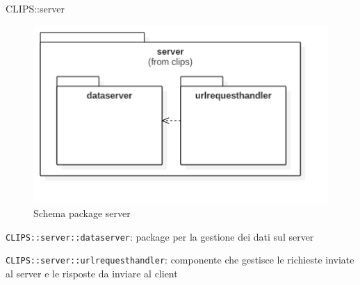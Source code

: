 \begin{componente}{CLIPS::server}
\begin{figure}[h!]
\centering
\includegraphics[scale=0.4]{img/package/png/server.png}
\caption{Schema package server}
 \end{figure}
\begin{compPackageContenuti}
\item \texttt{CLIPS::server::dataserver}: package per la gestione dei dati sul server
\item \texttt{CLIPS::server::urlrequesthandler}: componente che gestisce le richieste inviate al server e le risposte da inviare al client
\end{compPackageContenuti}
\end{componente}
